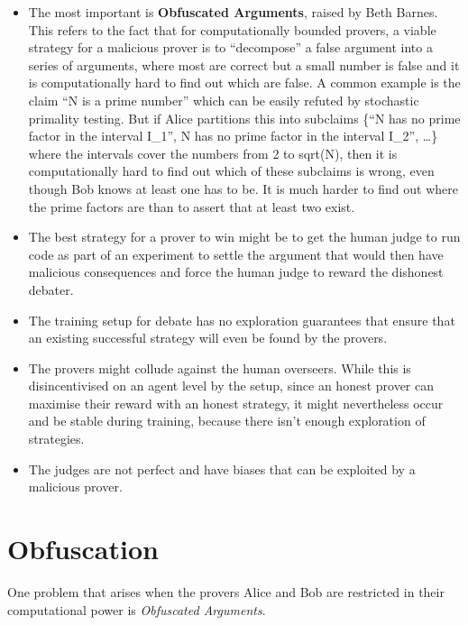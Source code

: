 \documentclass[11pt]{article}
\begin{document}
\begin{itemize}
  \item The most important is \textbf{Obfuscated Arguments}, raised by Beth
    Barnes. This refers to the fact that for computationally bounded provers, a
    viable strategy for a malicious prover is to ``decompose'' a false argument
    into a series of arguments, where most are correct but a small number is
    false and it is computationally hard to find out which are false. A common
    example is the claim ``N is a prime number'' which can be easily refuted by
    stochastic primality testing. But if Alice partitions this into subclaims
    \{``N has no prime factor in the interval I\_1'', N has no prime factor in
    the interval I\_2'', \ldots\} where the intervals cover the numbers from 2 to
    sqrt(N), then it is computationally hard to find out which of these subclaims
    is wrong, even though Bob knows at least one has to be. It is much harder to
    find out where the prime factors are than to assert that at least two exist.
  \item The best strategy for a prover to win might be to get the human judge to
    run code as part of an experiment to settle the argument that would then have
    malicious consequences and force the human judge to reward the dishonest
    debater.
  \item The training setup for debate has no exploration guarantees that ensure
    that an existing successful strategy will even be found by the provers.
  \item The provers might collude against the human overseers. While this is
    disincentivised on an agent level by the setup, since an honest prover can
    maximise their reward with an honest strategy, it might nevertheless occur
    and be stable during training, because there isn't enough exploration of
    strategies.
  \item The judges are not perfect and have biases that can be exploited by a
    malicious prover.
\end{itemize}


\section{Obfuscation}
\label{sec:obfuscation}

One problem that arises when the provers Alice and Bob are restricted in their computational power is \emph{Obfuscated Arguments}.
\end{document}
